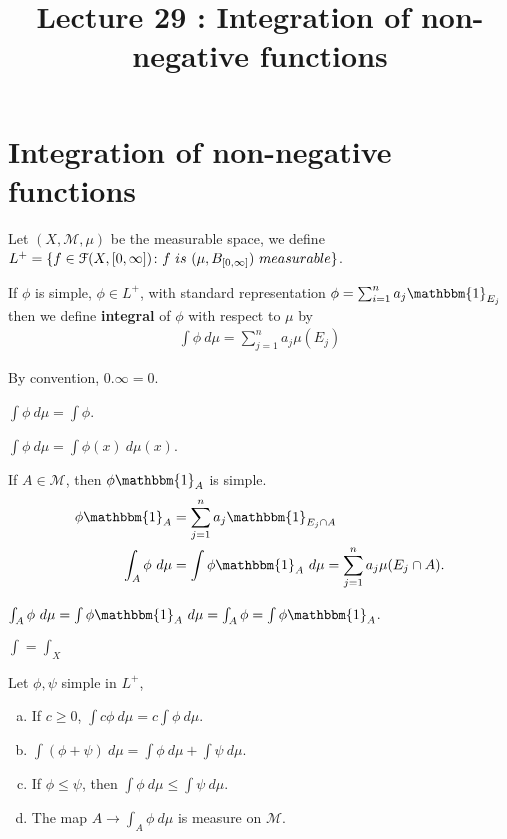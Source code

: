 \documentclass[a4paper,english,12pt]{article}   	%
\title{Lecture 29 : Integration of non-negative functions}
\author{}
\begin{document}
\maketitle
\section{Integration of non-negative functions}
\begin{defn}
Let $(X, \mathcal{M},\mu)$ be the measurable space, we define $L^{+} = \{f \in \mathcal{F}(X,[0,\infty]) \colon f ~is  ~ (\mu , B_{[0,\infty]}) ~measurable  \}$.
\end{defn}
\begin{defn}
If $\phi$ is simple, $\phi \in L^{+}$, with standard representation $\phi = \sum_{i =1}^{n} a_{j} \mathbbm{1}_{E_{j}}$ then we define \textbf{integral} of $\phi$ with respect to $\mu$ by
\begin{align*}
\int \phi ~d\mu = \sum_{j=1}^{n} a_{j} \mu(E_{j})
\end{align*}
\end{defn}
\begin{rem}
By convention, $0 . \infty = 0$.
\end{rem}
\begin{rem}
$\int \phi ~d\mu = \int \phi $.
\end{rem}
\begin{rem}
$\int \phi ~d\mu = \int \phi(x)~d\mu(x)$.
\end{rem}
\begin{rem}
If $A \in \mathcal{M}$, then $\phi \mathbbm{1}_{A}$ is simple.
\begin{align*}
\phi \mathbbm{1}_{A} &= \sum_{j=1}^{n} a_{j} \mathbbm{1}_{E_{j}\cap A} \\
\int_{A} \phi ~d\mu &= \int \phi \mathbbm{1}_{A} ~d\mu = \sum_{j=1}^{n} a_{j} \mu(E_{j} \cap A).
\end{align*}
\end{rem}
\begin{rem}
$ \int_{A} \phi ~d\mu = \int \phi \mathbbm{1}_{A} ~d\mu = \int_{A} \phi = \int \phi \mathbbm{1}_{A}$.
\end{rem}
\begin{rem}
$\int = \int_{X}$
\end{rem}
\begin{prop}
Let $\phi,\psi$ simple in $L^{+}$,
\begin{enumerate}[a)]
\item If $c \geq 0$, $ \int c \phi ~d\mu = c \int \phi ~d\mu$. 
\item $\int (\phi + \psi) ~d\mu = \int \phi ~d\mu + \int \psi ~d\mu$.
\item If $\phi \leq \psi$, then $\int \phi ~d\mu \leq \int \psi ~d\mu$.
\item The map $A \to \int_{A} \phi ~d\mu$ is measure on $\mathcal{M}$.
\end{enumerate}
\end{prop}
\end{document}
